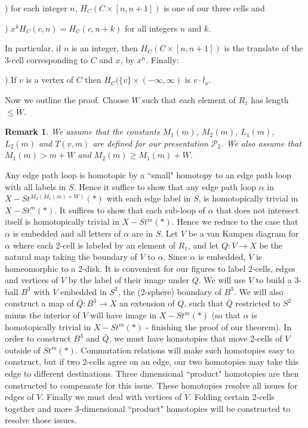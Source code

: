 \documentclass[12pt]{article}
\newtheorem{remark}[theorem]{Remark}
\numberwithin{equation}{section}
\begin{document}
) for each integer $n$, $H_C(C\times [n,n+1])$ is one of our three cells and 

) $x^kH_C(c,n)=H_C(c,n+k)$ for all integers $n$ and $k$. 

In particular, if $n$ is an integer, then $H_C(C\times [n,n+1])$ is the translate of the 3-cell corresponding to $C$ and $x$,  by $x^n$.  Finally:

\medskip

) If $v$ is a vertex of $C$ then $H_C(\{v\}\times (-\infty,\infty)$ is  $v\cdot l_x$. 

\medskip

Now we outline the proof. Choose $W$ such that each element of $R_1$ has length $\leq W$. %
\begin{remark}\label{R1}
We assume that the constants $M_1(m)$, $M_2(m)$, $L_1(m)$, $L_2(m)$ and $T(v,m)$ are defined for our presentation $\mathcal P_2$. We also assume that $M_1(m)>m+W$ and $M_2(m)\geq M_1(m)+W$. %
\end{remark}
 
Any edge path loop is homotopic by a ``small" homotopy to an edge path loop with all labels in $S$. Hence it suffice to show that any edge path loop $\alpha$ in $X-St^{M_2(M_1(m)+W)}(\ast)$ with each edge label in $S$, is homotopically trivial in $X-St^m(\ast)$. It suffices to show that each sub-loop of $\alpha$ that does not intersect itself is homotopically trivial in $X-St^m(\ast)$. Hence we reduce to the case that $\alpha$ is embedded and all letters of $\alpha$ are in $S$.  Let $V$ be a van Kampen diagram for $\alpha$ where each 2-cell is labeled by an element of $R_1$, and let $Q:V\to X$ be the natural map taking the boundary of $V$ to $\alpha$. Since $\alpha$ is embedded, $V$ is homeomorphic to a 2-disk. It is convenient for our figures to label 2-cells, edges and vertices of $V$ by the label of their image under $Q$. We will use $V$ to build a 3-ball $B^3$ with $V$ embedded in $S^2$, the (2-sphere) boundary of $B^3$. We will also construct a map of $\bar Q:B^3\to X$ an extension of $Q$, such that $\bar Q$ restricted to $S^2$ minus the interior of $V$ will have image in $X-St^m(\ast)$ (so that $\alpha$ is homotopically trivial in $X-St^m(\ast)$ - finishing the proof of our theorem). In order to construct $B^3$ and $\bar Q$, we must have homotopies that move 2-cells of $V$ outside of $St^m(\ast)$. Commutation relations will make such homotopies  easy to construct, but if two 2-cells agree on an edge, our two homotopies may take this edge to different destinations. Three dimensional ``product" homotopies are then constructed to compensate for this issue. These homotopies resolve all issues for edges of $V$. Finally we must deal with vertices of $V$. Folding certain 2-cells together and more 3-dimensional  ``product" homotopies will be constructed to resolve those issues. 
\end{document}
